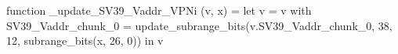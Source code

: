 function _update_SV39_Vaddr_VPNi (v, x) = let v = { v with SV39_Vaddr_chunk_0 = update_subrange_bits(v.SV39_Vaddr_chunk_0, 38, 12, subrange_bits(x, 26, 0)) } in
  v
